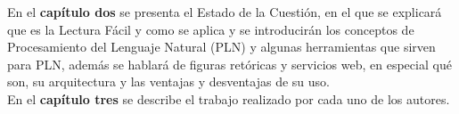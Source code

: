 En el \textbf{capítulo dos} se presenta el Estado de la Cuestión, en el que se explicará que es la Lectura Fácil y como se aplica y se introducirán los conceptos de Procesamiento del Lenguaje Natural (PLN) y algunas herramientas que sirven para PLN, además se hablará de figuras retóricas y servicios web, en especial qué son, su arquitectura y las ventajas y desventajas de su uso.\\


En el \textbf{capítulo tres} se describe el trabajo realizado por cada uno de los autores.
